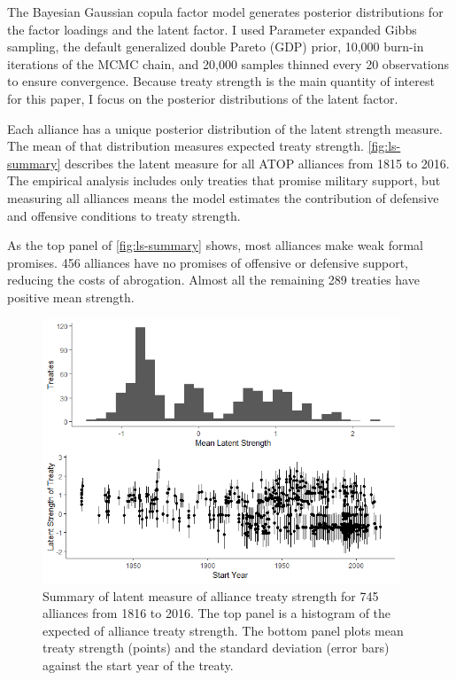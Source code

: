 \documentclass[12pt]{article}
\begin{document}
The Bayesian Gaussian copula factor model generates posterior distributions for the factor loadings and the latent factor. 
I used Parameter expanded Gibbs sampling, the default generalized double Pareto (GDP) prior, 10,000 burn-in iterations of the MCMC chain, and 20,000 samples thinned every 20 observations to ensure convergence. 
Because treaty strength is the main quantity of interest for this paper, I focus on the posterior distributions of the latent factor. 


Each alliance has a unique posterior distribution of the latent strength measure. 
The mean of that distribution measures expected treaty strength. 
\autoref{fig:ls-summary} describes the latent measure for all ATOP alliances from 1815 to 2016.
The empirical analysis includes only treaties that promise military support, but measuring all alliances means the model estimates the contribution of defensive and offensive conditions to treaty strength. 


As the top panel of \autoref{fig:ls-summary} shows, most alliances make weak formal promises.
456 alliances have no promises of offensive or defensive support, reducing the costs of abrogation. 
Almost all the remaining 289 treaties have positive mean strength. 


\begin{figure}
	\centering
		\includegraphics[width=0.95\textwidth]{../figures/ls-summary.png}
	\caption{Summary of latent measure of alliance treaty strength for 745 alliances from 1816 to 2016. The top panel is a histogram of the expected of alliance treaty strength. The bottom panel plots mean treaty strength (points) and the standard deviation (error bars) against the start year of the treaty.}
	\label{fig:ls-summary}
\end{figure}
	
\end{document}
